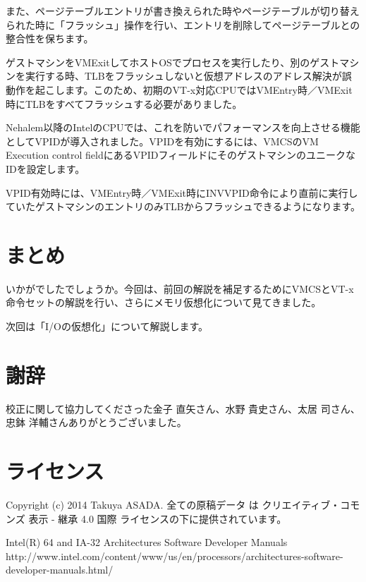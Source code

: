 \documentclass[a4j,12pt]{jarticle}
\begin{document}
また、ページテーブルエントリが書き換えられた時やページテーブルが切り替えられた時に「フラッシュ」操作を行い、エントリを削除してページテーブルとの整合性を保ちます。

ゲストマシンをVMExitしてホストOSでプロセスを実行したり、別のゲストマシンを実行する時、TLBをフラッシュしないと仮想アドレスのアドレス解決が誤動作を起こします。このため、初期のVT-x対応CPUではVMEntry時／VMExit時にTLBをすべてフラッシュする必要がありました。

Nehalem以降のIntelのCPUでは、これを防いでパフォーマンスを向上させる機能としてVPIDが導入されました。VPIDを有効にするには、VMCSのVM Execution control fieldにあるVPIDフィールドにそのゲストマシンのユニークなIDを設定します。

VPID有効時には、VMEntry時／VMExit時にINVVPID命令により直前に実行していたゲストマシンのエントリのみTLBからフラッシュできるようになります。

\section{まとめ}
いかがでしたでしょうか。今回は、前回の解説を補足するためにVMCSとVT-x命令セットの解説を行い、さらにメモリ仮想化について見てきました。

次回は「I/Oの仮想化」について解説します。

\section{謝辞}
校正に関して協力してくださった金子 直矢さん、水野 貴史さん、太居 司さん、忠鉢 洋輔さんありがとうございました。

\section{ライセンス}
Copyright (c) 2014 Takuya ASADA.
全ての原稿データ は クリエイティブ・コモンズ 表示 - 継承 4.0 国際 ライセンスの下に提供されています。

\begin{thebibliography}{4}
   Intel(R) 64 and IA-32 Architectures Software Developer Manuals http://www.intel.com/content/www/us/en/processors/architectures-software-developer-manuals.html/
\end{thebibliography}
\end{document}
